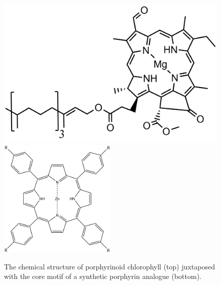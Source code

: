 \begin{figure}
    \centering
    \includegraphics[width = \textwidth]{images/PDIpy/background/chlorophyll.png} \\ \midrule
    \includegraphics[width = 0.5\textwidth]{images/PDIpy/background/zinc_porphyrin.png}
    \caption{
        The chemical structure of porphyrinoid chlorophyll (top) juxtaposed with the core motif of a synthetic porphyrin analogue (bottom).
    }
    \label{zinc_porphyrin}
\end{figure}


